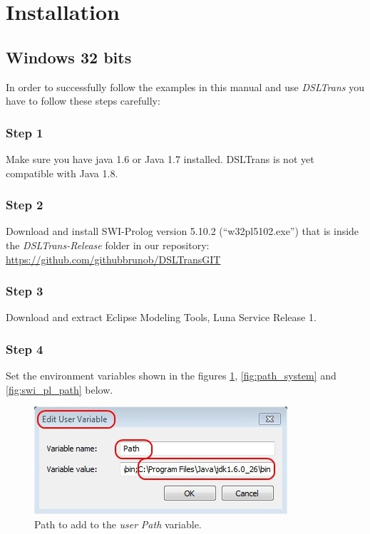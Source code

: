 ﻿\section{Installation}
\label{sec:installation}

\subsection{Windows 32 bits}

In order to successfully follow the examples in this manual and use
\emph{DSLTrans} you have to follow these steps carefully:

\subsubsection{Step 1}
Make sure you have java 1.6 or Java 1.7 installed. DSLTrans is not yet compatible with Java 1.8.

\subsubsection{Step 2}
Download and install SWI-Prolog version 5.10.2 (``w32pl5102.exe'') that is inside the \emph{DSLTrans-Release} folder in our repository:
\url{https://github.com/githubbrunob/DSLTransGIT}

\subsubsection{Step 3}
Download and extract Eclipse Modeling Tools, Luna Service Release 1.

\subsubsection{Step 4}
Set the environment variables shown in the figures \ref{fig:path_user}, \ref{fig:path_system} and \ref{fig:swi_pl_path} below.

\begin{figure}[h]
\begin{center}
  \includegraphics[scale=0.9]{imgs/path_user.jpg}
  \caption{Path to add to the \emph{user} \emph{Path} variable.}
  \label{fig:path_user}
\end{center}
\end{figure}

